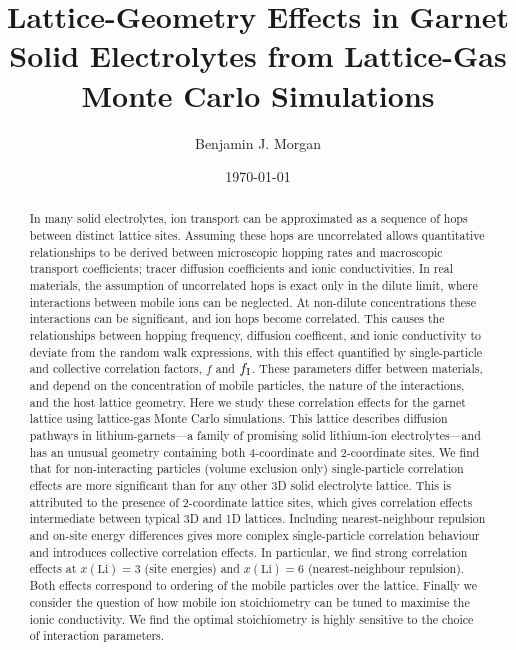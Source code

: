 \documentclass[aps,prb,twocolumn,superscriptaddress,reprint]{revtex4-1}
\begin{document}
\title{Lattice-Geometry Effects in Garnet Solid Electrolytes from Lattice-Gas Monte Carlo Simulations}
\author{Benjamin J. Morgan}

\date{\today}

\begin{abstract}
In many solid electrolytes, ion transport can be approximated as a sequence of hops between distinct lattice sites. Assuming these hops are uncorrelated allows quantitative relationships to be derived between microscopic hopping rates and macroscopic transport coefficients; tracer diffusion coefficients and ionic conductivities. In real materials, the assumption of uncorrelated hops is exact only in the dilute limit, where interactions between mobile ions can be neglected. At non-dilute concentrations these interactions can be significant, and ion hops become correlated. This causes the relationships between hopping frequency, diffusion coefficent, and ionic conductivity to deviate from the random walk expressions, with this effect quantified by single-particle and collective correlation factors, $f$ and $f_{\mathrm{I}}$. These parameters differ between materials, and depend on the concentration of mobile particles, the nature of the interactions, and the host lattice geometry. 
Here we study these correlation effects for the garnet lattice using lattice-gas Monte Carlo simulations. This lattice describes diffusion pathways in lithium-garnets---a family of promising solid lithium-ion electrolytes---and has an unusual geometry containing both 4-coordinate and 2-coordinate sites. We find that for non-interacting particles (volume exclusion only) single-particle correlation effects are more significant than for any other 3D solid electrolyte lattice. This is attributed to the presence of 2-coordinate lattice sites, which gives correlation effects intermediate between typical 3D and 1D lattices. Including nearest-neighbour repulsion and on-site energy differences gives more complex single-particle correlation behaviour and introduces collective correlation effects. In particular, we find strong correlation effects at $x(\mathrm{Li})=3$ (site energies) and $x(\mathrm{Li})=6$ (nearest-neighbour repulsion). Both effects correspond to ordering of the mobile particles over the lattice. Finally we consider the question of how mobile ion stoichiometry can be tuned to maximise the ionic conductivity. We find the optimal stoichiometry is highly sensitive to the choice of interaction parameters.
\end{abstract}
\end{document}
